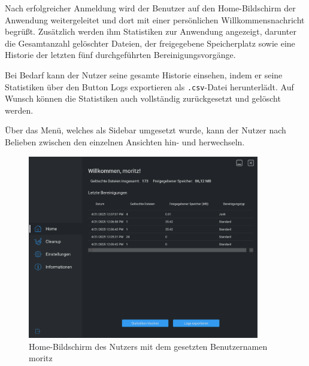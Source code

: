 Nach erfolgreicher Anmeldung wird der Benutzer auf den Home-Bildschirm der Anwendung weitergeleitet und dort mit einer persönlichen Willkommensnachricht begrüßt. Zusätzlich werden ihm Statistiken zur Anwendung angezeigt, darunter die Gesamtanzahl gelöschter Dateien, der freigegebene Speicherplatz sowie eine Historie der letzten fünf durchgeführten Bereinigungsvorgänge. 

Bei Bedarf kann der Nutzer seine gesamte Historie einsehen, indem er seine Statistiken über den Button \glqq Logs exportieren\grqq{} als \texttt{.csv}-Datei herunterlädt. Auf Wunsch können die Statistiken auch vollständig zurückgesetzt und gelöscht werden. 

Über das Menü, welches als Sidebar umgesetzt wurde, kann der Nutzer nach Belieben zwischen den einzelnen Ansichten hin- und herwechseln.

\begin{figure}[H]
    \centering
    \includegraphics[width=0.9\textwidth]{src/screenshot_home.png}
    \caption{Home-Bildschirm des Nutzers mit dem gesetzten Benutzernamen \glqq moritz\grqq{}}
\end{figure}

